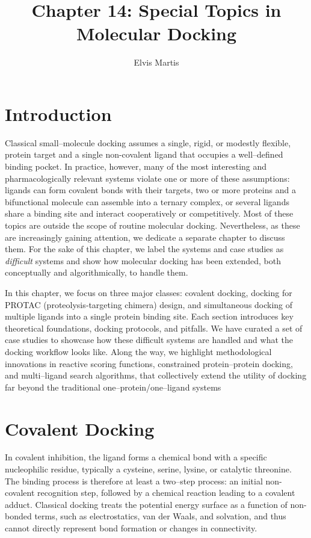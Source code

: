 \documentclass[12pt]{article}
\begin{document}
\title{Chapter 14: Special Topics in Molecular Docking}
\author{Elvis Martis}
\date{}
\maketitle

\section{Introduction}

Classical small–molecule docking assumes a single, rigid, or modestly flexible, protein target and a single non-covalent ligand that occupies a well–defined binding pocket.  In practice, however, many of the most interesting and pharmacologically relevant systems violate one or more of these assumptions: ligands can form covalent bonds with their targets, two or more proteins and a bifunctional molecule can assemble into a ternary complex, or several ligands share a binding site and interact cooperatively or competitively.  Most of these topics are outside the scope of routine molecular docking. Nevertheless, as these are increasingly gaining attention, we dedicate a separate chapter to discuss them. For the sake of this chapter, we label the systems and case studies as  \emph{difficult} systems and show how molecular docking has been extended, both conceptually and algorithmically, to handle them.

In this chapter, we focus on three major classes: covalent docking, docking for PROTAC (proteolysis‐targeting chimera) design, and simultaneous docking of multiple ligands into a single protein binding site.  Each section introduces key theoretical foundations, docking protocols, and pitfalls. We have curated a set of case studies to showcase how these difficult systems are handled and what the docking workflow looks like. Along the way, we highlight methodological innovations in reactive scoring functions, constrained protein–protein docking, and multi–ligand search algorithms, that collectively extend the utility of docking far beyond the traditional one–protein/one–ligand systems

\section{Covalent Docking}

In covalent inhibition, the ligand forms a chemical bond with a specific nucleophilic residue, typically a cysteine, serine, lysine, or catalytic threonine. The binding process is therefore at least a two–step process: an initial non-covalent recognition step, followed by a chemical reaction leading to a covalent adduct.  Classical docking treats the potential energy surface as a function of non-bonded terms, such as electrostatics, van der Waals, and solvation, and thus cannot directly represent bond formation or changes in connectivity.
\end{document}
